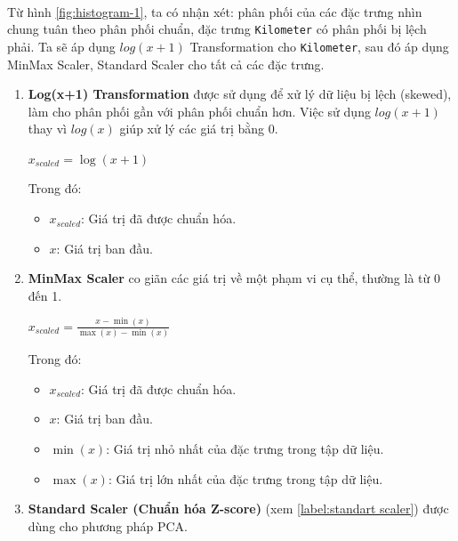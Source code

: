 \paragraph{}{Từ hình \ref{fig:histogram-1}, ta có nhận xét: phân phối của các đặc trưng nhìn chung tuân theo phân phối chuẩn, đặc trưng \texttt{Kilometer} có phân phối bị lệch phải. Ta sẽ áp dụng $log(x+1)$ Transformation \cite{benoit2011linear} cho \texttt{Kilometer}, sau đó áp dụng MinMax Scaler, Standard Scaler \cite{brownlee2020use} cho tất cả các đặc trưng.}
\begin{enumerate}
    \item \textbf{Log(x+1) Transformation} được sử dụng để xử lý dữ liệu bị lệch (skewed), làm cho phân phối gần với phân phối chuẩn hơn. Việc sử dụng $log(x+1)$ thay vì $log(x)$ giúp xử lý các giá trị bằng 0.

    \begin{center}
    \large $x_{scaled} = \log(x+1)$
    \end{center}

    Trong đó:
    \begin{itemize}
        \item $x_{scaled}$: Giá trị đã được chuẩn hóa.
        \item $x$: Giá trị ban đầu.
    \end{itemize}

    \item \textbf{MinMax Scaler} co giãn các giá trị về một phạm vi cụ thể, thường là từ 0 đến 1.

    \begin{center}
    \large $x_{scaled} = \frac{x - \min(x)}{\max(x) - \min(x)}$
    \end{center}

    Trong đó:
    \begin{itemize}
        \item $x_{scaled}$: Giá trị đã được chuẩn hóa.
        \item $x$: Giá trị ban đầu.
        \item $\min(x)$: Giá trị nhỏ nhất của đặc trưng trong tập dữ liệu.
        \item $\max(x)$: Giá trị lớn nhất của đặc trưng trong tập dữ liệu.
    \end{itemize}

    \item \textbf{Standard Scaler (Chuẩn hóa Z-score)} (xem \ref{label:standart scaler}) được dùng cho phương pháp PCA.
\end{enumerate}

